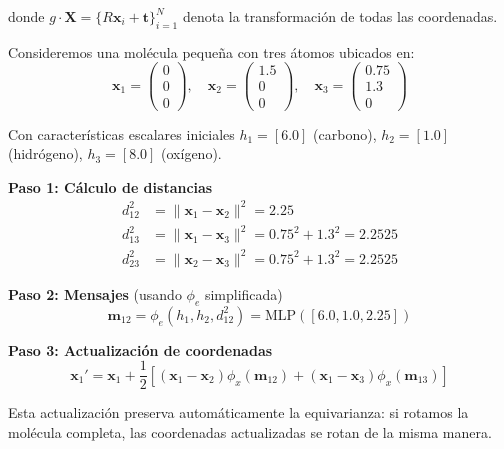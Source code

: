 donde $g \cdot \mathbf{X} = \{R\mathbf{x}_i + \mathbf{t}\}_{i=1}^N$ denota la transformación de todas las coordenadas.

\begin{example}\label{ex:egnn_molecular}
Consideremos una molécula pequeña con tres átomos ubicados en:
\begin{equation}
\mathbf{x}_1 = \begin{pmatrix} 0 \\ 0 \\ 0 \end{pmatrix}, \quad
\mathbf{x}_2 = \begin{pmatrix} 1.5 \\ 0 \\ 0 \end{pmatrix}, \quad
\mathbf{x}_3 = \begin{pmatrix} 0.75 \\ 1.3 \\ 0 \end{pmatrix}
\end{equation}

Con características escalares iniciales $h_1 = [6.0]$ (carbono), $h_2 = [1.0]$ (hidrógeno), $h_3 = [8.0]$ (oxígeno).

\textbf{Paso 1: Cálculo de distancias}
\begin{align}
d_{12}^2 &= \|\mathbf{x}_1 - \mathbf{x}_2\|^2 = 2.25 \\
d_{13}^2 &= \|\mathbf{x}_1 - \mathbf{x}_3\|^2 = 0.75^2 + 1.3^2 = 2.2525 \\
d_{23}^2 &= \|\mathbf{x}_2 - \mathbf{x}_3\|^2 = 0.75^2 + 1.3^2 = 2.2525
\end{align}

\textbf{Paso 2: Mensajes} (usando $\phi_e$ simplificada)
\begin{equation}
\mathbf{m}_{12} = \phi_e(h_1, h_2, d_{12}^2) = \text{MLP}([6.0, 1.0, 2.25])
\end{equation}

\textbf{Paso 3: Actualización de coordenadas}
\begin{equation}
\mathbf{x}_1' = \mathbf{x}_1 + \frac{1}{2}\left[(\mathbf{x}_1 - \mathbf{x}_2)\phi_x(\mathbf{m}_{12}) + (\mathbf{x}_1 - \mathbf{x}_3)\phi_x(\mathbf{m}_{13})\right]
\end{equation}

Esta actualización preserva automáticamente la equivarianza: si rotamos la molécula completa, las coordenadas actualizadas se rotan de la misma manera.
\end{example}

